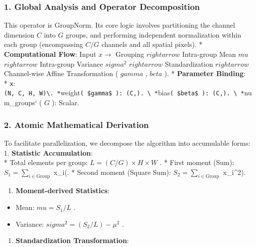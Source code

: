 \documentclass[
  10
]{article}
\providecommand{\tightlist}{%
  \setlength{\itemsep}{0pt}\setlength{\parskip}{0pt}}
\begin{document}
\subsubsection{1. Global Analysis and Operator
Decomposition}\label{global-analysis-and-operator-decomposition}

This operator is GroupNorm. Its core logic involves partitioning the
channel dimension \(C\) into \(G\) groups, and performing independent
normalization within each group (encompassing \(C/G\) channels and all
spatial pixels). * \textbf{Computational Flow}: Input \(x \rightarrow\)
Grouping \(rightarrow\) Intra-group Mean \(mu\) \(rightarrow\)
Intra-group Variance \(sigma^2\) \(rightarrow\) Standardization
\(rightarrow\) Channel-wise Affine Transformation ( \(gamma\) , \(beta\)
). * \textbf{Parameter Binding}:\\
* \texttt{x}:
\texttt{(N,\ C,\ H,\ W)\textbackslash{}\textquotesingle{}.\ *}weight\texttt{(\ \$gamma\$\ ):\ \textquotesingle{}(C,)\textquotesingle{}.\ \textbackslash{}\ *}bias\texttt{(\ \$beta\$\ ):\ \textquotesingle{}(C,)\textquotesingle{}.\ \textbackslash{}\ *}num\_groups`
( \(G\) ): Scalar.

\subsubsection{2. Atomic Mathematical
Derivation}\label{atomic-mathematical-derivation}

To facilitate parallelization, we decompose the algorithm into
accumulable forms: 1. \textbf{Statistic Accumulation}:\\
* Total elements per group: \(L = (C/G) \times H \times W\) . * First
moment (Sum): \(S_1 = \sum_{i \in \text{Group}}\) x\_i(. * Second moment
(Square Sum): \(S_2 = \sum_{i \in \text{Group}}\) x\_i\^{}2).

\begin{enumerate}
\def\labelenumi{\arabic{enumi}.}
\setcounter{enumi}{1}
\tightlist
\item
  \textbf{Moment-derived Statistics}:\\
\end{enumerate}

\begin{itemize}
\tightlist
\item
  Mean: \(mu = S_1 / L\) .
\item
  Variance: \(sigma^2 = (S_2 / L) - \mu^2\) .
\end{itemize}

\begin{enumerate}
\def\labelenumi{\arabic{enumi}.}
\setcounter{enumi}{2}
\tightlist
\item
  \textbf{Standardization Transformation}:\\
\end{enumerate}
\end{document}
